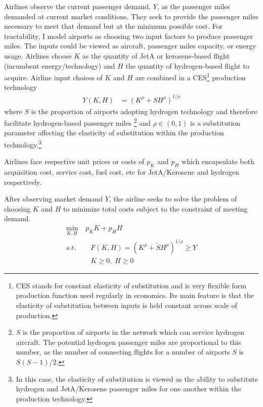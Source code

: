 \documentclass[a4paper, 14pt]{article}
\begin{document}
Airlines observe the current passenger demand, $Y$, as the passenger miles demanded at current market conditions.
They seek to provide the passenger miles necessary to meet that demand but at the minimum possible cost.
For tractability, I model airports as choosing two input factors to produce passenger miles.
The inputs could be viewed as aircraft, passenger miles capacity, or energy usage.
Airlines choose $K$ as the quantity of JetA or kerosene-based flight (incumbent energy/technology) and $H$ the quantity of hydrogen-based flight to acquire.
Airline input choices of $K$ and $H$ are combined in a CES\footnote{CES stands for constant elasticity of substitution and is very flexible form production function used regularly in economics. Its main feature is that the elasticity of substitution between inputs is held constant across scale of production.} production technology
\begin{align}
    Y(K,H) &= \left( K^{\rho} + SH^{\rho} \right)^{1/\rho} \label{eq:production}
\end{align}
where $S$ is the proportion of airports adopting hydrogen technology and therefore facilitate hydrogen-based passenger miles \footnote{$S$ is the proportion of airports in the network which can service hydrogen aircraft. The potential hydrogen passenger miles are proportional to this number, as the number of connecting flights for a number of airports $S$ is $S(S-1)/2$.} and $\rho \in (0,1)$ is a substitution parameter affecting the elasticity of substitution within the production technology.\footnote{In this case, the elasticity of substitution is viewed as the ability to substitute hydrogen and JetA/Kerosene passenger miles for one another within the production technology.}

Airlines face respective unit prices or costs of $p_K$ and $p_H$ which encapsulate both acquisition cost, service cost, fuel cost, etc for JetA/Kerosene and hydrogen respectively.

After observing market demand $Y$, the airline seeks to solve the problem of choosing $K$ and $H$ to minimize total costs subject to the constraint of meeting demand.
\begin{align}
    \min_{K,H} &\; p_K K + p_H H \nonumber \\
    s.t. &\quad F(K,H) = \left( K^{\rho} + \tilde{S}H^{\rho} \right)^{1/\rho} \geq Y \nonumber \\
    &\quad K\geq 0,\; H\geq 0 \nonumber
\end{align}
\end{document}
